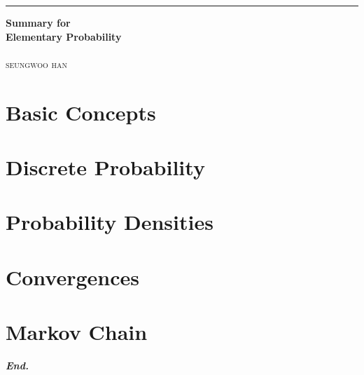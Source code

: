\documentclass[a4paper,12pt]{report}
\begin{document}

\begin{titlepage}
	\raggedleft

	\rule{1pt}{\textheight}
	\hspace{0.05\textwidth}
	\parbox[b]{0.75\textwidth}{

        {\Huge\bfseries Summary for\\[0.5\baselineskip] Elementary Probability}\\[2\baselineskip]
		\\[4\baselineskip]
		{\Large\textsc{seungwoo han}}

		\vspace{0.5\textheight}
	}
\end{titlepage}
\tableofcontents
\hypersetup{
    linkcolor=Maroon,
    filecolor=black,
    urlcolor=Maroon,
}
\pagebreak


\chapter{Basic Concepts}





\chapter{Discrete Probability}






\chapter{Probability Densities}








\chapter{Convergences}







\chapter{Markov Chain}




\vfill
\begin{center}
    \textbf{\textit{End.}}
\end{center}
\end{document}
